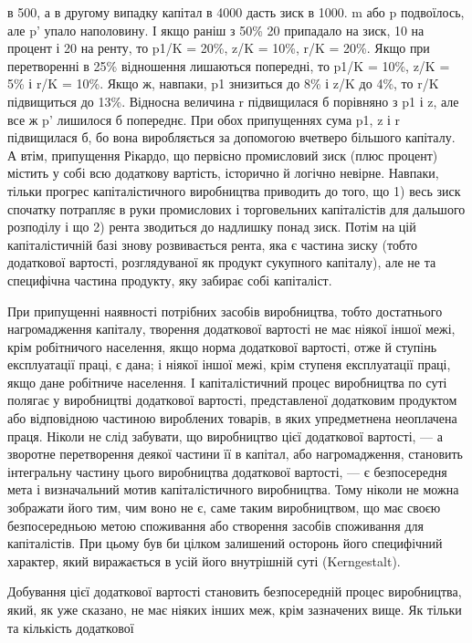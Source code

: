 в 500, а в другому випадку капітал в 4000 дасть зиск в 1000.
m або p подвоїлось, але p' упало наполовину. І якщо раніш
з 50\% 20 припадало на зиск, 10 на процент і 20 на ренту, то p1/K =
20\%, z/K = 10\%, r/K = 20\%. Якщо при перетворенні в 25\%
відношення лишаються попередні, то p1/K = 10\%, z/K = 5\% і r/K =
10\%. Якщо ж, навпаки, p1 знизиться до 8\% і z/K до 4\%, то r/K
підвищиться до 13\%. Відносна величина r підвищилася б порівняно
з p1 і z, але все ж p' лишилося б попереднє. При обох припущеннях
сума p1, z і r підвищилася б, бо вона виробляється
за допомогою вчетверо більшого капіталу. А втім, припущення
Рікардо, що первісно промисловий зиск (плюс процент) містить
у собі всю додаткову вартість, історично й логічно невірне.
Навпаки, тільки прогрес капіталістичного виробництва приводить
до того, що 1) весь зиск спочатку потрапляє в руки промислових
і торговельних капіталістів для дальшого розподілу
і що 2) рента зводиться до надлишку понад зиск. Потім на цій
капіталістичній базі знову розвивається рента, яка є частина зиску
(тобто додаткової вартості, розглядуваної як продукт сукупного
капіталу), але не та специфічна частина продукту, яку забирає
собі капіталіст.

При припущенні наявності потрібних засобів виробництва,
тобто достатнього нагромадження капіталу, творення додаткової
вартості не має ніякої іншої межі, крім робітничого населення,
якщо норма додаткової вартості, отже й ступінь експлуатації
праці, є дана; і ніякої іншої межі, крім ступеня експлуатації
праці, якщо дане робітниче населення. І капіталістичний
процес виробництва по суті полягає у виробництві додаткової
вартості, представленої додатковим продуктом або відповідною
частиною вироблених товарів, в яких упредметнена неоплачена
праця. Ніколи не слід забувати, що виробництво цієї додаткової
вартості, — а зворотне перетворення деякої частини її в капітал,
або нагромадження, становить інтегральну частину цього виробництва
додаткової вартості, — є безпосередня мета і визначальний
мотив капіталістичного виробництва. Тому ніколи не можна зображати
його тим, чим воно не є, саме таким виробництвом, що має
своєю безпосередньою метою споживання або створення засобів
споживання для капіталістів. При цьому був би цілком
залишений осторонь його специфічний характер, який виражається
в усій його внутрішній суті (Kerngestalt).

Добування цієї додаткової вартості становить безпосередній
процес виробництва, який, як уже сказано, не має ніяких інших
меж, крім зазначених вище. Як тільки та кількість додаткової
